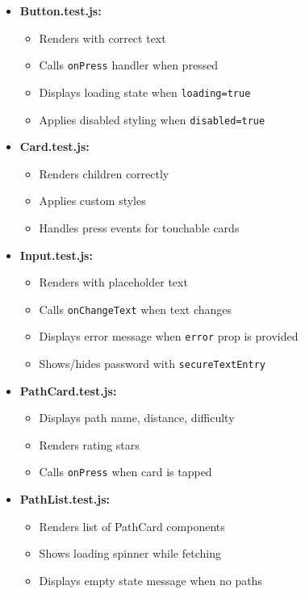 \begin{itemize}
    \item \textbf{Button.test.js:}
    \begin{itemize}
        \item Renders with correct text
        \item Calls \texttt{onPress} handler when pressed
        \item Displays loading state when \texttt{loading=true}
        \item Applies disabled styling when \texttt{disabled=true}
    \end{itemize}
    
    \item \textbf{Card.test.js:}
    \begin{itemize}
        \item Renders children correctly
        \item Applies custom styles
        \item Handles press events for touchable cards
    \end{itemize}
    
    \item \textbf{Input.test.js:}
    \begin{itemize}
        \item Renders with placeholder text
        \item Calls \texttt{onChangeText} when text changes
        \item Displays error message when \texttt{error} prop is provided
        \item Shows/hides password with \texttt{secureTextEntry}
    \end{itemize}
    
    \item \textbf{PathCard.test.js:}
    \begin{itemize}
        \item Displays path name, distance, difficulty
        \item Renders rating stars
        \item Calls \texttt{onPress} when card is tapped
    \end{itemize}
    
    \item \textbf{PathList.test.js:}
    \begin{itemize}
        \item Renders list of PathCard components
        \item Shows loading spinner while fetching
        \item Displays empty state message when no paths
    \end{itemize}
\end{itemize}

